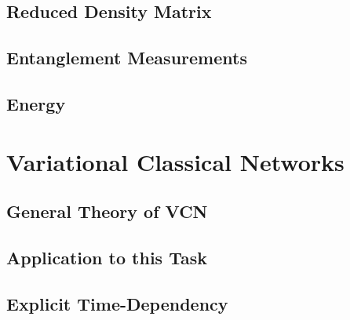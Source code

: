 \documentclass[
headings=optiontohead,              %
12pt,                               %
DIV=13,                             %
twoside=false,                      %
open=right,                         %
BCOR=00mm,                          %
toc=bibliographynumbered            %
]{scrreport}
\begin{document}
        \subsection{Reduced Density Matrix}
        \label{sec:theory-observables-density-matrix}
        
        \FloatBarrier
        
        \subsection{Entanglement Measurements}
        \label{sec:theory-observables-entanglement}
        
        \FloatBarrier
        
        \subsection{Energy}
        \label{sec:theory-observables-energy}
        
        \FloatBarrier

    \section{Variational Classical Networks}
    \label{sec:theory-variational-classical-networks}
    
    \FloatBarrier
        
        \subsection{General Theory of VCN}
        \label{sec:theory-variational-classical-networks-basics}
        
        \FloatBarrier


        \subsection{Application to this Task}
        \label{sec:theory-variational-classical-networks-application}
        
        \FloatBarrier

        
        \subsection{Explicit Time-Dependency}
        \label{sec:theory-variational-classical-networks-time-dependency}
        
        \FloatBarrier
\end{document}
